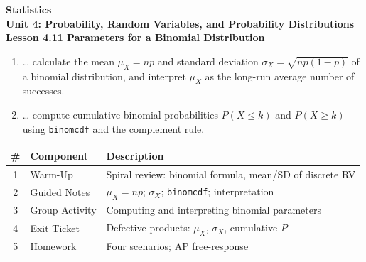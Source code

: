 \documentclass[10pt]{article}
\begin{document}
\vspace{-0.8in}

\begin{center}
  {\color{white}\textbf{\LARGE Statistics}}\\[4pt]
  {\color{skymid}\large\textbf{Unit 4: Probability, Random Variables, and Probability Distributions}}\\[6pt]
  {\color{white}\textbf{\large Lesson 4.11 \quad Parameters for a Binomial Distribution}}
\end{center}

\vspace{0.22in}
\namedateperiod
\vspace{0.18in}

\begin{learningtargetbox}
\small
\begin{enumerate}[leftmargin=1.5em, itemsep=5pt]
  \item \ldots{} calculate the mean $\mu_X = np$ and standard deviation
        $\sigma_X = \sqrt{np(1-p)}$ of a binomial distribution, and interpret
        $\mu_X$ as the long-run average number of successes.
  \item \ldots{} compute cumulative binomial probabilities $P(X \le k)$ and
        $P(X \ge k)$ using \texttt{binomcdf} and the complement rule.
\end{enumerate}
\end{learningtargetbox}

\vspace{0.14in}

\begin{tocbox}
\small
\renewcommand{\arraystretch}{1.5}
\begin{tabularx}{\linewidth}{@{} c l X @{}}
\rowcolor{sky}
\textbf{\#} & \textbf{Component} & \textbf{Description} \\
\midrule
1 & Warm-Up        & Spiral review: binomial formula, mean/SD of discrete RV \\
2 & Guided Notes   & $\mu_X = np$; $\sigma_X$; \texttt{binomcdf}; interpretation \\
3 & Group Activity & Computing and interpreting binomial parameters \\
4 & Exit Ticket    & Defective products: $\mu_X$, $\sigma_X$, cumulative $P$ \\
5 & Homework       & Four scenarios; AP free-response \\
\end{tabularx}
\end{tocbox}
\end{document}
